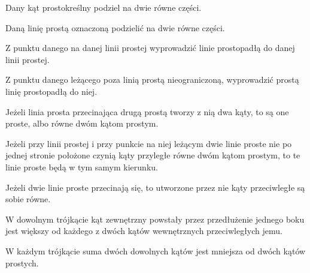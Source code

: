 \begin{euclid_theorem}
    Dany kąt prostokreślny podziel na dwie równe części.
\end{euclid_theorem}

\begin{euclid_theorem}
    Daną linię prostą oznaczoną podzielić na dwie równe części.
\end{euclid_theorem}

\begin{euclid_theorem}
    Z punktu danego na danej linii prostej wyprowadzić linie prostopadłą do danej linii prostej.
\end{euclid_theorem}

\begin{euclid_theorem}
    Z punktu danego leżącego poza linią prostą nieograniczoną, wyprowadzić prostą linię prostopadłą do niej.
\end{euclid_theorem}

\begin{euclid_theorem}
    Jeżeli linia prosta przecinająca drugą prostą tworzy z nią dwa kąty, to są one proste, albo równe dwóm kątom prostym.
\end{euclid_theorem}

\begin{euclid_theorem}
    Jeżeli przy linii prostej i przy punkcie na niej leżącym dwie linie proste nie po jednej stronie położone czynią kąty przyległe równe dwóm kątom prostym, to te linie proste będą w tym samym kierunku.
\end{euclid_theorem}

\begin{euclid_theorem}
    Jeżeli dwie linie proste przecinają się, to utworzone przez nie kąty przeciwległe są sobie równe.
\end{euclid_theorem}

\begin{euclid_theorem}
    W dowolnym trójkącie kąt zewnętrzny powstały przez przedłużenie jednego boku jest większy od każdego z dwóch kątów wewnętrznych przeciwległych jemu.
\end{euclid_theorem}

\begin{euclid_theorem}
    W każdym trójkącie suma dwóch dowolnych kątów jest mniejsza od dwóch kątów prostych.
\end{euclid_theorem}

